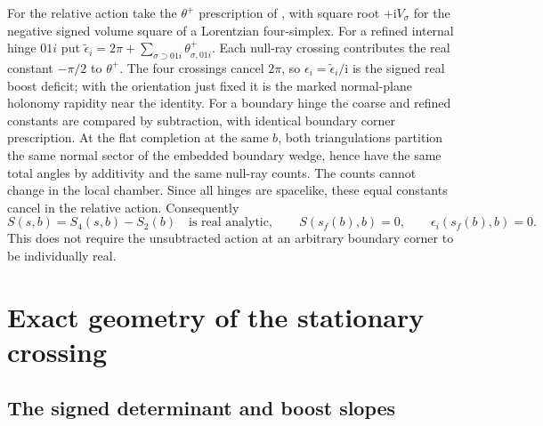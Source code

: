 \documentclass[11pt]{article}
\newcommand{\I}{\mathrm i}
\begin{document}
For the relative action take the \(\theta^+\) prescription of \cite[Eqs.~(1)--(3), (29)--(32)]{BD}, with square root \(+\I V_\sigma\) for the negative signed volume square of a Lorentzian four-simplex. For a refined internal hinge \(01i\) put \(\widetilde\epsilon_i=2\pi+\sum_{\sigma\supset 01i}\theta^+_{\sigma,01i}\). Each null-ray crossing contributes the real constant \(-\pi/2\) to \(\theta^+\). The four crossings cancel \(2\pi\), so
\(\epsilon_i=\widetilde\epsilon_i/\I\) is the signed real boost deficit; with the orientation just fixed it is the marked normal-plane holonomy rapidity near the identity. For a boundary hinge the coarse and refined constants are compared by subtraction, with identical boundary corner prescription. At the flat completion at the same \(b\), both triangulations partition the same normal sector of the embedded boundary wedge, hence have the same total angles by additivity and the same null-ray counts. The counts cannot change in the local chamber. Since all hinges are spacelike, these equal constants cancel in the relative action. Consequently
\begin{equation}\label{eq:real}
 S(s,b)=S_4(s,b)-S_2(b)\quad\text{is real analytic},\qquad
 S(s_f(b),b)=0,\qquad \epsilon_i(s_f(b),b)=0 .
\end{equation}
This does not require the unsubtracted action at an arbitrary boundary corner to be individually real.

\section{Exact geometry of the stationary crossing}

\subsection{The signed determinant and boost slopes}
\end{document}
